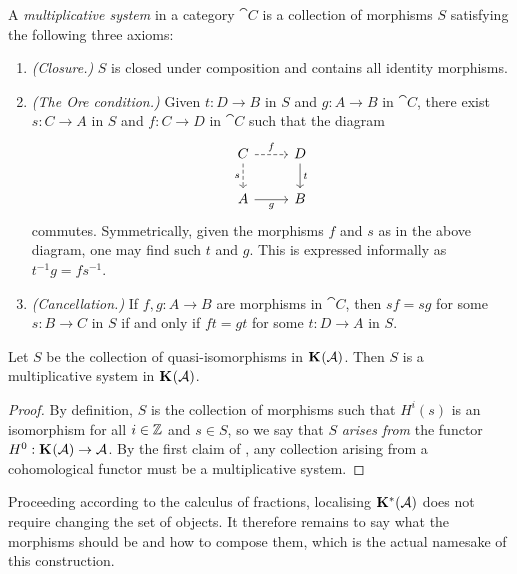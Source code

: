 \begin{definition}
  A \emph{multiplicative system} in a category $\cat{C}$ is a
  collection of morphisms $S$ satisfying the following three axioms:
  \begin{enumerate}
    \item
      \emph{(Closure.)}
      $S$ is closed under composition and contains all identity morphisms.

    \item
      \emph{(The Ore condition.)}
      Given $t: D \to B$ in $S$ and $g: A \to B$ in $\cat{C}$, there
      exist $s: C \to A$ in $S$ and $f: C \to D$ in $\cat{C}$ such
      that the diagram
      \[
        \begin{tikzcd}
          C & D \\
          A & B
          \arrow["{f}", dashed, from=1-1, to=1-2]
          \arrow["{s}"', dashed, from=1-1, to=2-1]
          \arrow["t", from=1-2, to=2-2]
          \arrow["g"', from=2-1, to=2-2]
        \end{tikzcd}
      \]
      commutes.
      Symmetrically, given the morphisms $f$ and $s$ as in the above
      diagram, one may find such $t$ and $g$.
      This is expressed informally as $t^{-1} g = f s^{-1}$.

    \item
      \emph{(Cancellation.)}
      If $f,g: A \to B$ are morphisms in $\cat{C}$, then $sf = sg$
      for some $s: B \to C$ in $S$ if and only if $ft = gt$ for some
      $t: D \to A$ in $S$.
  \end{enumerate}
\end{definition}

\begin{proposition}
  Let $S$ be the collection of quasi-isomorphisms in $\homcat{\abcat{A}}$.
  Then $S$ is a multiplicative system in $\homcat{\abcat{A}}$.
\end{proposition}

\begin{proof}
  By definition, $S$ is the collection of morphisms such that
  $H^i(s)$ is an isomorphism for all $i \in \bb{Z}$ and $s \in S$, so
  we say that $S$ \emph{arises from} the functor $H^0:
  \homcat{\abcat{A}} \to \abcat{A}$.
  By the first claim of \cite[Proposition~10.4.1]{weibel}, any
  collection arising from a cohomological functor must be a
  multiplicative system.
\end{proof}

Proceeding according to the calculus of fractions, localising
$\homcat[*]{\abcat{A}}$ does not require changing the set of objects.
It therefore remains to say what the morphisms should be and how to
compose them, which is the actual namesake of this construction.

